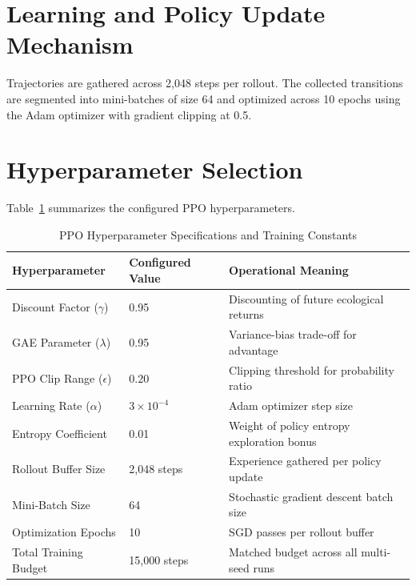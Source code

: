 \documentclass[12pt,a4paper]{report}
\begin{document}
\section{Learning and Policy Update Mechanism}
Trajectories are gathered across 2,048 steps per rollout. The collected transitions are segmented into mini-batches of size 64 and optimized across 10 epochs using the Adam optimizer with gradient clipping at 0.5.

\section{Hyperparameter Selection}
Table~\ref{tab:hyperparams} summarizes the configured PPO hyperparameters.

\begin{table}[H]
\centering
\caption{PPO Hyperparameter Specifications and Training Constants}
\label{tab:hyperparams}
\begin{tabular}{lll}
\toprule
\textbf{Hyperparameter} & \textbf{Configured Value} & \textbf{Operational Meaning} \\
\midrule
Discount Factor ($\gamma$) & 0.95 & Discounting of future ecological returns \\
GAE Parameter ($\lambda$) & 0.95 & Variance-bias trade-off for advantage \\
PPO Clip Range ($\epsilon$) & 0.20 & Clipping threshold for probability ratio \\
Learning Rate ($\alpha$) & $3 \times 10^{-4}$ & Adam optimizer step size \\
Entropy Coefficient & 0.01 & Weight of policy entropy exploration bonus \\
Rollout Buffer Size & 2,048 steps & Experience gathered per policy update \\
Mini-Batch Size & 64 & Stochastic gradient descent batch size \\
Optimization Epochs & 10 & SGD passes per rollout buffer \\
Total Training Budget & 15,000 steps & Matched budget across all multi-seed runs \\
\bottomrule
\end{tabular}
\end{table}
\end{document}
